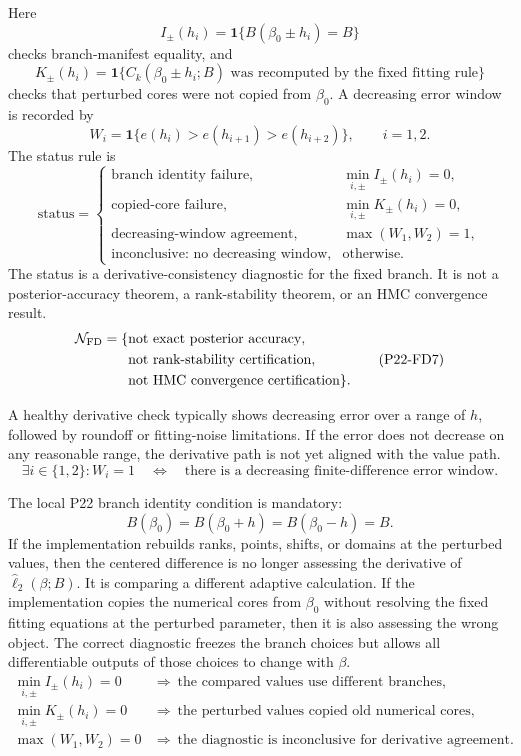 \documentclass[11pt]{article}
\newcommand{\ind}{\mathbf 1}
\newcommand{\widehatell}{\widehat\ell}
\begin{document}
Here
\[
    I_\pm(h_i)
    =
    \ind\{B(\beta_0\pm h_i)=B\}
    \tag{P22-FD2}
\]
checks branch-manifest equality, and
\[
    K_\pm(h_i)
    =
    \ind\{C_k(\beta_0\pm h_i;B)
    \text{ was recomputed by the fixed fitting rule}\}
    \tag{P22-FD3}
\]
checks that perturbed cores were not copied from \(\beta_0\).  A decreasing
error window is recorded by
\[
    W_i=\ind\{e(h_i)>e(h_{i+1})>e(h_{i+2})\},
    \qquad i=1,2.
    \tag{P22-FD4}
\]
The status rule is
\[
\text{status}
=
\begin{cases}
\text{branch identity failure},&
    \min_{i,\pm} I_\pm(h_i)=0,\\
\text{copied-core failure},&
    \min_{i,\pm} K_\pm(h_i)=0,\\
\text{decreasing-window agreement},&
    \max(W_1,W_2)=1,\\
\text{inconclusive: no decreasing window},&
    \text{otherwise}.
\end{cases}
\tag{P22-FD5}
\]
The status is a derivative-consistency diagnostic for the fixed branch.  It is
not a posterior-accuracy theorem, a rank-stability theorem, or an HMC
convergence result.
\[
    \begin{aligned}
    \mathcal N_{\rm FD}
    =
    \{&
    \text{not exact posterior accuracy},\\
    &\text{not rank-stability certification},\\
    &\text{not HMC convergence certification}\}.
    \end{aligned}
    \tag{P22-FD7}
\]

A healthy derivative check typically shows decreasing error over a range of
\(h\), followed by roundoff or fitting-noise limitations.  If the error does
not decrease on any reasonable range, the derivative path is not yet aligned
with the value path.
\[
    \exists i\in\{1,2\}: W_i=1
    \quad\Longleftrightarrow\quad
    \text{there is a decreasing finite-difference error window.}
    \tag{P22-FD8}
\]

The local P22 branch identity condition is mandatory:
\[
    B(\beta_0)=B(\beta_0+h)=B(\beta_0-h)=B.
    \tag{P22-FD6}
\]
If the implementation rebuilds ranks, points, shifts, or domains at the
perturbed values, then the centered difference is no longer assessing the
derivative of \(\widehatell_2(\beta;B)\).  It is comparing a different
adaptive calculation.
If the implementation copies the numerical cores from \(\beta_0\) without
resolving the fixed fitting equations at the perturbed parameter, then it is
also assessing the wrong object.  The correct diagnostic freezes the branch choices but
allows all differentiable outputs of those choices to change with \(\beta\).
\[
    \begin{array}{ll}
    \min_{i,\pm}I_\pm(h_i)=0
    &\Rightarrow\ \text{the compared values use different branches},\\[2mm]
    \min_{i,\pm}K_\pm(h_i)=0
    &\Rightarrow\ \text{the perturbed values copied old numerical cores},\\[2mm]
    \max(W_1,W_2)=0
    &\Rightarrow\ \text{the diagnostic is inconclusive for derivative agreement}.
    \end{array}
    \tag{P22-FD9}
\]
\end{document}
